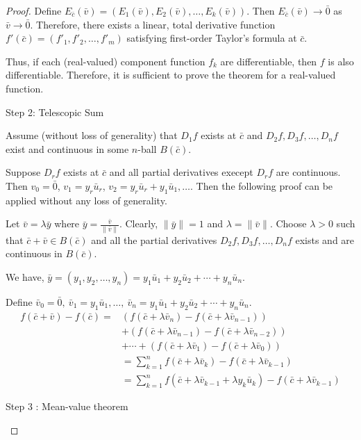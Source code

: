 \begin{proof}
Define $E_{\bar{c}}(\bar{v}) = \left( E_1(\bar{v}), E_2(\bar{v}), \dots, E_k(\bar{v}) \right)$.
Then $E_{\bar{c}}(\bar{v}) \to \bar{0}$ as $\bar{v} \to \bar{0}$.
Therefore, there exists a linear, total derivative function $f'(\bar{c}) = \left( f'_1, f'_2, \dots, f'_m \right)$ satisfying first-order Taylor's formula at $\bar{c}$.

Thus, if each (real-valued) component function $f_k$ are differentiable, then $f$ is also differentiable.
Therefore, it is sufficient to prove the theorem for a real-valued function.\\
\begin{commentary}Step 2: Telescopic Sum\end{commentary}

Assume (without loss of generality) that $D_1f$ exists at $\bar{c}$ and $D_2f,D_3f,\dots,D_nf$ exist and continuous in some $n$-ball $B(\bar{c})$.
\begin{commentary} Suppose $D_rf$ exists at $\bar{c}$ and all partial derivatives execept $D_rf$ are continuous.
	Then $v_0 = \bar{0}$, $v_1 = y_r\bar{u}_r$, $v_2 = y_r\bar{u}_r + y_1\bar{u}_1, \dotsc$.
Then the following proof can be applied without any loss of generality.
\end{commentary}

Let $\bar{v} = \lambda\bar{y}$ where $\bar{y} = \frac{\bar{v}}{\|\bar{v}\|}$.
Clearly, $\|\bar{y}\| = 1$ and $\lambda = \| \bar{v} \|$.
Choose $\lambda > 0$ such that $\bar{c}+\bar{v} \in B(\bar{c})$ and all the partial derivatives $D_2f, D_3f, \dots, D_nf$ exists and are continuous in $B(\bar{c})$.

	We have, $\bar{y} = (y_1, y_2, \dots, y_n) = y_1 \bar{u}_1 + y_2 \bar{u}_2 + \dotsb + y_n \bar{u}_n$.

	Define $\bar{v}_0 = \bar{0},\ \bar{v}_1 = y_1\bar{u}_1, \dots, \ \bar{v}_n = y_1 \bar{u}_1 + y_2 \bar{u}_2 + \dotsb + y_n \bar{u}_n$.
\begin{align*}
	f(\bar{c}+\bar{v}) - f(\bar{c}) = & ( f(\bar{c}+\lambda{} \bar{v}_n) - f(\bar{c}+\lambda{} \bar{v}_{n-1}) ) \\
	& + ( f(\bar{c}+\lambda{} \bar{v}_{n-1}) - f(\bar{c}+\lambda{} \bar{v}_{n-2}) ) \\
	& + \dotsb + ( f(\bar{c}+\lambda{} \bar{v}_1) - f(\bar{c}+\lambda{} \bar{v}_0) ) \\
	& = \sum_{k = 1}^n f(\bar{c} + \lambda{} \bar{v}_k) - f(\bar{c} + \lambda{} \bar{v}_{k-1}) \\
	& = \sum_{k = 1}^n f(\bar{c} + \lambda{} \bar{v}_{k-1} + \lambda{} y_k \bar{u}_k) - f(\bar{c} + \lambda{} \bar{v}_{k-1})
\end{align*}
\begin{commentary}Step 3 : Mean-value theorem\end{commentary}


\end{proof}
